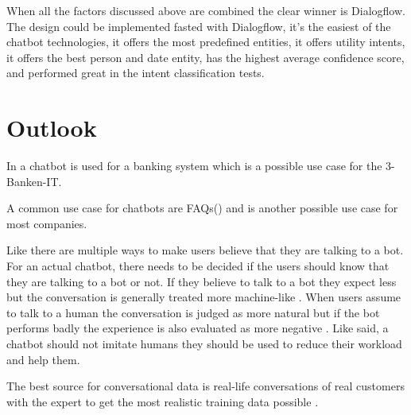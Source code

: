 When all the factors discussed above are combined the clear winner is Dialogflow.
The design could be implemented fasted with Dialogflow, it's the easiest of the chatbot technologies,
it offers the most predefined entities, it offers utility intents, it offers the best person and date entity, 
has the highest average confidence score, and performed great in the intent classification tests. 




\section{Outlook}
In \citet{singhbuilding} a chatbot is used for a banking system which is a possible use case for the 3-Banken-IT.

A common use case for chatbots are FAQs(\citet{evaluateChatbotsShawar2007, buiildChatbotsPython, huang2007extracting, GO2019304}) 
and is another possible use case for most companies.


Like \citet{GO2019304} there are multiple ways to make users believe that they are talking to a bot.
For an actual chatbot, there needs to be decided if the users should know that they are talking to a bot or not.
If they believe to talk to a bot they expect less but the conversation is generally treated more machine-like \cite{GO2019304}.
When users assume to talk to a human the conversation is judged as more natural but if the bot performs badly the experience is also evaluated as more negative \cite{GO2019304}.
Like \citet{shawar2007chatbots} said, a chatbot should not imitate humans they should be used to reduce their workload and help them.

The best source for conversational data is real-life conversations of real customers with the expert to get the most realistic training data possible \cite{singhbuilding}.